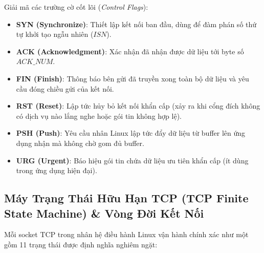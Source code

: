 Giải mã các trường cờ cốt lõi (\textit{Control Flags}):
\begin{itemize}
  \item \textbf{SYN (Synchronize)}: Thiết lập kết nối ban đầu, dùng để đàm phán số thứ tự khởi tạo ngẫu nhiên ($ISN$).
  \item \textbf{ACK (Acknowledgment)}: Xác nhận đã nhận được dữ liệu tới byte số $ACK\_NUM$.
  \item \textbf{FIN (Finish)}: Thông báo bên gửi đã truyền xong toàn bộ dữ liệu và yêu cầu đóng chiều gửi của kết nối.
  \item \textbf{RST (Reset)}: Lập tức hủy bỏ kết nối khẩn cấp (xảy ra khi cổng đích không có dịch vụ nào lắng nghe hoặc gói tin không hợp lệ).
  \item \textbf{PSH (Push)}: Yêu cầu nhân Linux lập tức đẩy dữ liệu từ buffer lên ứng dụng nhận mà không chờ gom đủ buffer.
  \item \textbf{URG (Urgent)}: Báo hiệu gói tin chứa dữ liệu ưu tiên khẩn cấp (ít dùng trong ứng dụng hiện đại).
\end{itemize}

\subsection{Máy Trạng Thái Hữu Hạn TCP (TCP Finite State Machine) \& Vòng Đời Kết Nối}
\label{subsec:tcp-state-machine}
Mỗi socket TCP trong nhân hệ điều hành Linux vận hành chính xác như một  gồm 11 trạng thái được định nghĩa nghiêm ngặt:

